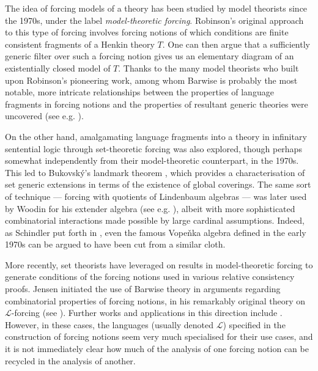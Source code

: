 \documentclass[12pt, twoside]{memoir}
\numberwithin{equation}{section}
\theoremstyle{definition}
\theoremstyle{remark}
\theoremstyle{definition}
\theoremstyle{definition}
\theoremstyle{definition}
\theoremstyle{remark}
\begin{document}
The idea of forcing models of a theory has been studied by model theorists since the 1970s, under the label \emph{model-theoretic forcing}. Robinson's original approach to this type of forcing involves forcing notions of which conditions are finite consistent fragments of a Henkin theory $T$. One can then argue that a sufficiently generic filter over such a forcing notion gives us an elementary diagram of an existentially closed model of $T$. Thanks to the many model theorists who built upon Robinson's pioneering work, among whom Barwise is probably the most notable, more intricate relationships between the properties of language fragments in forcing notions and the properties of resultant generic theories were uncovered (see e.g. \cite{keisler}).

On the other hand, amalgamating language fragments into a theory in infinitary sentential logic through set-theoretic forcing was also explored, though perhaps somewhat independently from their model-theoretic counterpart, in the 1970s. This led to Bukovsk\'{y}'s landmark theorem \cite{bukovsky1}, which provides a characterisation of set generic extensions in terms of the existence of global coverings. The same sort of technique --- forcing with quotients of Lindenbaum algebras ---  was later used by Woodin for his extender algebra (see e.g. \cite{farah}), albeit with more sophisticated combinatorial interactions made possible by large cardinal assumptions. Indeed, as Schindler put forth in \cite{schindler-hod}, even the famous Vope\v{n}ka algebra \cite{vopenka} defined in the early 1970s can be argued to have been cut from a similar cloth.

More recently, set theorists have leveraged on results in model-theoretic forcing to generate conditions of the forcing notions used in various relative consistency proofs. Jensen initiated the use of Barwise theory in arguments regarding combinatorial properties of forcing notions, in his remarkably original theory on $\mathcal{L}$-forcing (see \cite{lforcing}). Further works and applications in this direction include \cite{doebler}. However, in these cases, the languages (usually denoted $\mathcal{L}$) specified in the construction of forcing notions seem very much specialised for their use cases, and it is not immediately clear how much of the analysis of one forcing notion can be recycled in the analysis of another. 
\end{document}
